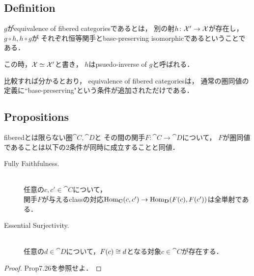 \documentclass[a4paper, dvipdfmx]{jsarticle}
\begin{document}
\subsection{Definition}
    \begin{Def}[Equivalence]
        $g$がequivalence of fibered categoriesであるとは，
        別の射$h \colon \mathcal{X}' \to \mathcal{X}$が存在し，
        $g \circ h, h \circ g$が
        それぞれ恒等関手とbase-preserving isomorphicであるということである．

        この時，$\mathcal{X} \simeq \mathcal{X}'$と書き，
        $h$はpsuedo-inverse of $g$と呼ばれる．
    \end{Def}
    \begin{Remark}
        比較すれば分かるとおり，
        equivalence of fibered categoriesは，
        通常の圏同値の定義に``base-preserving"という条件が追加されただけである．
    \end{Remark}

\subsection{Propositions}
    \begin{Prop}
        fiberedとは限らない圏$\cat{C}, \cat{D}$と
        その間の関手$F \colon \cat{C} \to \cat{D}$について，
        $F$が圏同値であることは以下の$2$条件が同時に成立することと同値．
        \begin{description}
            \item[Fully Faithfulness.] \mbox{}\\
                任意の$c,c' \in \cat{C}$について，\mbox{}\\
                関手$F$が与えるclassの対応$\operatorname{Hom}_{\mathbf{C}}(c, c') \to \operatorname{Hom}_{\mathbf{D}}(F(c), F(c'))$は全単射である．

            \item[Essential Surjectivity.] \mbox{}\\
                任意の$d \in \cat{D}$について，$F(c) \cong d$となる対象$c \in \cat{C}$が存在する．
        \end{description}
    \end{Prop}
    \begin{proof}
        \cite{Awodey} Prop7.26を参照せよ．
    \end{proof}
\end{document}
